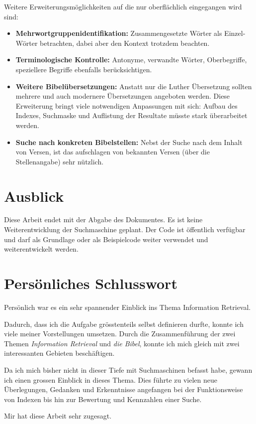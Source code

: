 Weitere Erweiterungsmöglichkeiten auf die nur oberflächlich eingegangen wird sind:
\begin{itemize}[noitemsep]
	\item \textbf{Mehrwortgruppenidentifikation:} Zusammengesetzte Wörter als Einzel-Wörter betrachten, dabei aber den Kontext trotzdem beachten.
	
	\item \textbf{Terminologische Kontrolle:} Antonyme, verwandte Wörter, Oberbegriffe, speziellere Begriffe ebenfalls berücksichtigen.

	\item \textbf{Weitere Bibelübersetzungen:} Anstatt nur die Luther Übersetzung sollten mehrere und auch modernere Übersetzungen angeboten werden. Diese Erweiterung bringt viele notwendigen Anpassungen mit sich: Aufbau des Indexes, Suchmaske und Auflistung der Resultate müsste stark überarbeitet werden.

	\item \textbf{Suche nach konkreten Bibelstellen:} Nebst der Suche nach dem Inhalt von Versen, ist das aufschlagen von bekannten Versen (über die Stellenangabe) sehr nützlich.
\end{itemize}


\section{Ausblick}
Diese Arbeit endet mit der Abgabe des Dokumentes.
Es ist keine Weiterentwicklung der Suchmaschine geplant. Der Code ist öffentlich verfügbar und darf als Grundlage oder als Beispielcode weiter verwendet und weiterentwickelt werden.


\section{Persönliches Schlusswort}
Persönlich war es ein sehr spannender Einblick ins Thema Information Retrieval.

Dadurch, dass ich die Aufgabe grösstenteils selbst definieren durfte, konnte ich viele meiner Vorstellungen umsetzen.
Durch die Zusammenführung der zwei Themen \textit{Information Retrieval} und \textit{die Bibel}, konnte ich mich gleich mit zwei interessanten Gebieten beschäftigen.

Da ich mich bisher nicht in dieser Tiefe mit Suchmaschinen befasst habe, gewann ich einen grossen Einblick in dieses Thema. Dies führte zu vielen neue Überlegungen, Gedanken und Erkenntnisse angefangen bei der Funktionsweise von Indexen bis hin zur Bewertung und Kennzahlen einer Suche.

Mir hat diese Arbeit sehr zugesagt.
